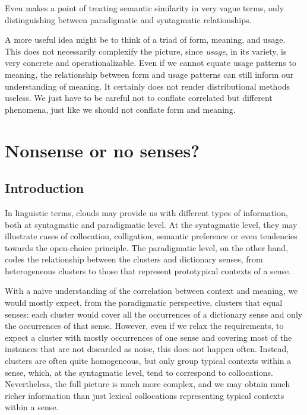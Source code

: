 \documentclass[
]{book}
\begin{document}
Even \textcite{sahlgren_2006} makes a point of treating semantic similarity in very vague terms,
only distinguishing between paradigmatic and syntagmatic relationships.

A more useful idea might be to think of a triad of form, meaning, and usage. This
does not necessarily complexify the picture, since \emph{usage}, in its variety, is very
concrete and operationalizable. Even if we cannot equate usage patterns to meaning,
the relationship between form and usage patterns can still inform our understanding of
meaning. It certainly does not render distributional methods useless. We just have
to be careful not to conflate correlated but different phenomena, just like we should
not conflate form and meaning.

\hypertarget{nonsense-or-no-senses}{%
\chapter{Nonsense or no senses?}\label{nonsense-or-no-senses}}

\hypertarget{introduction-1}{%
\section{Introduction}\label{introduction-1}}

In linguistic terms, clouds may provide us with different types of information, both at syntagmatic and paradigmatic level. At the syntagmatic level, they may illustrate cases of collocation, colligation, semantic preference or even tendencies towards the open-choice principle. The paradigmatic level, on the other hand, codes the relationship between the clusters and dictionary senses, from heterogeneous clusters to those that represent prototypical contexts of a sense.

With a naive understanding of the correlation between context and meaning, we would mostly expect, from the paradigmatic perspective, clusters that equal senses: each cluster would cover all the occurrences of a dictionary sense and only the occurrences of that sense. However, even if we relax the requirements, to expect a cluster with mostly occurrences of one sense and covering most of the instances that are not discarded as noise, this does not happen often. Instead, clusters are often quite homogeneous, but only group typical contexts within a sense, which, at the syntagmatic level, tend to correspond to collocations. Nevertheless, the full picture is much more complex, and we may obtain much richer information than just lexical collocations representing typical contexts within a sense.
\end{document}
